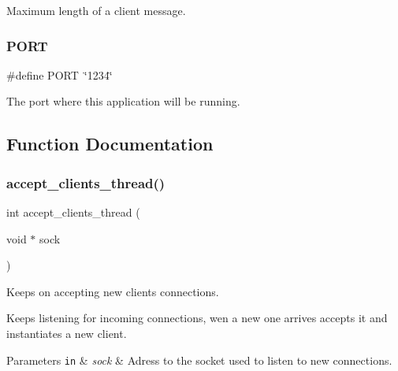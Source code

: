 Maximum length of a client message. 

\mbox{\label{zip-zop-server_8c_a614217d263be1fb1a5f76e2ff7be19a2}} 
\subsubsection{\texorpdfstring{P\+O\+RT}{PORT}}
{\footnotesize\ttfamily \#define P\+O\+RT~\char`\"{}1234\char`\"{}}



The port where this application will be running. 



\subsection{Function Documentation}
\mbox{\label{zip-zop-server_8c_a8c505192e7c73e767d53f7d282cfb646}} 
\subsubsection{\texorpdfstring{accept\+\_\+clients\+\_\+thread()}{accept\_clients\_thread()}}
{\footnotesize\ttfamily int accept\+\_\+clients\+\_\+thread (\begin{DoxyParamCaption}\item[{void $\ast$}]{sock }\end{DoxyParamCaption})}



Keeps on accepting new clients connections. 

Keeps listening for incoming connections, wen a new one arrives accepts it and instantiates a new client.


\begin{DoxyParams}[1]{Parameters}
\mbox{\tt in}  & {\em sock} & Adress to the socket used to listen to new connections. \\
\hline
\end{DoxyParams}
\mbox{\label{zip-zop-server_8c_a36e911ded647a0697ca152cae890bcf5}} 
